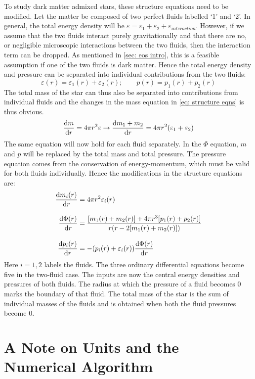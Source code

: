 \documentclass[a4paper,12pt,onehalfspacing]{report}
\begin{document}
To study dark matter admixed stars, these structure equations need to be modified. Let the matter be composed of two perfect fluids labelled `1' and `2'. In general, the total energy density will be $\varepsilon= \varepsilon_1+\varepsilon_2+\varepsilon_{interaction}$. However, if we assume that the two fluids interact purely gravitationally and that there are no, or negligible microscopic interactions between the two fluids, then the interaction term can be dropped. As mentioned in \cref{sec: eos intro}, this is a feasible assumption if one of the two fluids is dark matter. Hence the total energy density and pressure can be separated into individual contributions from the two fluids:
\begin{equation}
        \varepsilon(r)= \varepsilon_1(r)+\varepsilon_2(r);\qquad p(r)= p_1(r)+p_2(r)
\end{equation}
The total mass of the star can thus also be separated into contributions from individual fluids and the changes in the mass equation in \cref{eq: structure eqns} is thus obvious. 
\[\dv{m}{r}=4\pi r^2 \varepsilon\to\dv{m_1+m_2}{r}=4\pi r^2 \qty(\varepsilon_1+\varepsilon_2)\]
The same equation will now hold for each fluid separately. In the $\Phi$ equation, $m$ and $p$ will be replaced by the total mass and total pressure. The pressure equation comes from the conservation of energy-momentum, which must be valid for both fluids individually. Hence the modifications in the structure equations are: 
\begin{equation}
    \begin{aligned}
        \dv{m_i(r)}{r}&= 4\pi r^2 \varepsilon_i(r)\\[2ex]
        \dv{\Phi(r)}{r} &= \frac{[m_1(r)+m_2(r)]+4 \pi r^3[p_1(r)+p_2(r)]}{r \qty(r- 2 [m_1(r)+m_2(r)])}\\[2ex]
        \dv{p_i(r)}{r}&= -(p_i(r)+\varepsilon_i(r))\dv{\Phi(r)}{r}
    \end{aligned}\label{eq: structure eqns twof}
\end{equation}
Here $i=1,2$ labels the fluids. The three ordinary differential equations become five in the two-fluid case. The inputs are now the central energy densities and pressures of both fluids. The radius at which the pressure of a fluid becomes $0$ marks the boundary of that fluid. The total mass of the star is the sum of individual masses of the fluids and is obtained when both the fluid pressures become $0$. 

\section{A Note on Units and the Numerical Algorithm}
\end{document}
